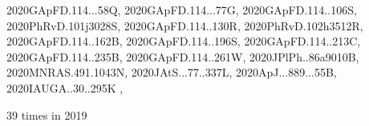 \documentclass[12pt]{article}
\begin{document}
\begin{description}
{2020GApFD.114...58Q,%
2020GApFD.114...77G,%
2020GApFD.114..106S,%
2020PhRvD.101j3028S,%
2020GApFD.114..130R,%
2020PhRvD.102h3512R,%
2020GApFD.114..162B,%
2020GApFD.114..196S,%
2020GApFD.114..213C,%
2020GApFD.114..235B,%
2020GApFD.114..261W,%
2020JPlPh..86a9010B,%
2020MNRAS.491.1043N,%
2020JAtS...77..337L,%
2020ApJ...889...55B,%
2020IAUGA..30..295K%
},\item
\item %
39 times in 2019 \citep{
Peng2019HelicityHT,%
2019arXiv190808781E,%
2019arXiv191101039P,%
2019ApJ...872..132P,%
2019arXiv190204172R,%
2019ESS.....431720G,%
2019arXiv191006896W,%
2019A&A...624L..12W,%
}
\end{description}
\end{document}
